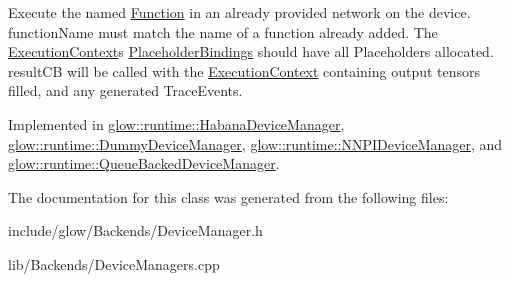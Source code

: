 Execute the named \hyperlink{classglow_1_1_function}{Function} in an already provided network on the device. function\+Name must match the name of a function already added. The \hyperlink{classglow_1_1_execution_context}{Execution\+Context}\textquotesingle{}s \hyperlink{classglow_1_1_placeholder_bindings}{Placeholder\+Bindings} should have all Placeholders allocated. result\+CB will be called with the \hyperlink{classglow_1_1_execution_context}{Execution\+Context} containing output tensors filled, and any generated Trace\+Events. 

Implemented in \hyperlink{classglow_1_1runtime_1_1_habana_device_manager_a345fedf5deacdb44274ed92de5dcc962}{glow\+::runtime\+::\+Habana\+Device\+Manager}, \hyperlink{classglow_1_1runtime_1_1_dummy_device_manager_a6a0da3ce939dea1323eead33a27d5487}{glow\+::runtime\+::\+Dummy\+Device\+Manager}, \hyperlink{classglow_1_1runtime_1_1_n_n_p_i_device_manager_a86f8010d5b5c6f235144d930f8392d3a}{glow\+::runtime\+::\+N\+N\+P\+I\+Device\+Manager}, and \hyperlink{classglow_1_1runtime_1_1_queue_backed_device_manager_a46bdff62e862da50435f4744a3587f1a}{glow\+::runtime\+::\+Queue\+Backed\+Device\+Manager}.



The documentation for this class was generated from the following files\+:\begin{DoxyCompactItemize}
\item 
include/glow/\+Backends/Device\+Manager.\+h\item 
lib/\+Backends/Device\+Managers.\+cpp\end{DoxyCompactItemize}
